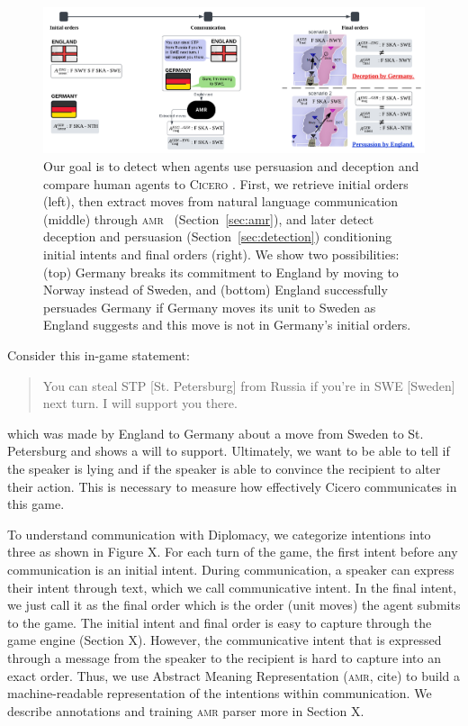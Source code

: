 \documentclass[oneside]{memoir}
\newcommand{\cicero}{\abr{Cicero} }
\newcommand{\abr}[1]{\textsc{#1}}
\begin{document}
\begin{figure}[t]
    \centering
    \includegraphics[width=\textwidth]{figures/dec_per_motivating_example.pdf}
    \caption{Our goal is to detect when agents use persuasion and deception and compare human agents to \cicero. First, we retrieve initial orders (left), then extract
      moves from natural language communication (middle) through \abr{amr}
      \ (Section~\ref{sec:amr}), and
      later detect deception and persuasion
      (Section~\ref{sec:detection}) conditioning initial intents and
      final orders (right). We show two possibilities: (top)
      Germany breaks its commitment to England by moving to Norway
      instead of Sweden, and (bottom) England successfully persuades
      Germany if Germany moves its unit to Sweden as England suggests
      and this move is not in Germany's initial orders.}
    \label{fig:dec_per_example}

\end{figure}

Consider this in-game statement:
\begin{quote}
    You can steal STP [St. Petersburg] from Russia if you’re in SWE [Sweden] next turn. I will support you there.
\end{quote}
which was made by England to Germany about a move from Sweden to St. Petersburg and shows a will to support. Ultimately, we want to be able to tell if the speaker is lying and if the speaker is able to convince the recipient to alter their action. This is necessary to measure how effectively Cicero communicates in this game. 

To understand communication with Diplomacy, we categorize intentions into three as shown in Figure X. For each turn of the game, the first intent before any communication is an initial intent. During communication, a speaker can express their intent through text, which we call communicative intent. In the final intent, we just call it as the final order which is the order (unit moves) the agent submits to the game. The initial intent and final order is easy to capture through the game engine (Section X). However, the communicative intent that is expressed through a message from the speaker to the recipient is hard to capture into an exact order. Thus, we use Abstract Meaning Representation (\abr{amr}, cite) to build a machine-readable representation of the intentions within communication. We describe annotations and training \abr{amr} parser more in Section X.
\end{document}
